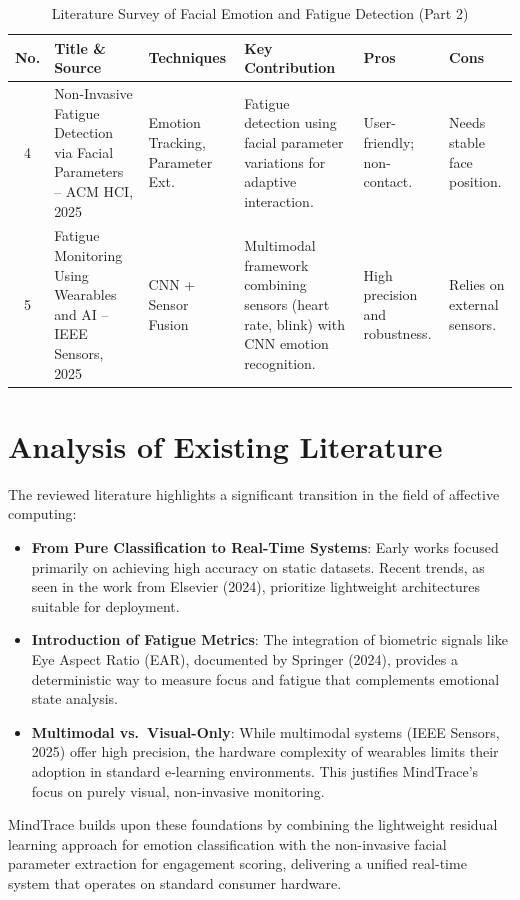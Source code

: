 \begin{table}[H]
\centering
\caption{Literature Survey of Facial Emotion and Fatigue Detection (Part 2)}
\label{tab:lit_survey_2}
\renewcommand{\arraystretch}{1.5}
\begin{tabularx}{\textwidth}{|c|X|p{2.5cm}|X|p{2cm}|p{2cm}|}
\hline
\textbf{No.} & \textbf{Title \& Source} & \textbf{Techniques} & \textbf{Key Contribution} & \textbf{Pros} & \textbf{Cons} \\
\hline
4 & Non-Invasive Fatigue Detection via Facial Parameters -- ACM HCI, 2025 & Emotion Tracking, Parameter Ext. & Fatigue detection using facial parameter variations for adaptive interaction. & User-friendly; non-contact. & Needs stable face position. \\
\hline
5 & Fatigue Monitoring Using Wearables and AI -- IEEE Sensors, 2025 & CNN + Sensor Fusion & Multimodal framework combining sensors (heart rate, blink) with CNN emotion recognition. & High precision and robustness. & Relies on external sensors. \\
\hline
\end{tabularx}
\end{table}

\section{Analysis of Existing Literature}

The reviewed literature highlights a significant transition in the field of
affective computing:

\begin{itemize}
    \item \textbf{From Pure Classification to Real-Time Systems}: Early
          works focused primarily on achieving high accuracy on static
          datasets. Recent trends, as seen in the work from Elsevier (2024),
          prioritize lightweight architectures suitable for deployment.
    
    \item \textbf{Introduction of Fatigue Metrics}: The integration of
          biometric signals like Eye Aspect Ratio (EAR), documented by
          Springer (2024), provides a deterministic way to measure focus
          and fatigue that complements emotional state analysis.
    
    \item \textbf{Multimodal vs.\ Visual-Only}: While multimodal systems
          (IEEE Sensors, 2025) offer high precision, the hardware
          complexity of wearables limits their adoption in standard
          e-learning environments. This justifies MindTrace's focus on
          purely visual, non-invasive monitoring.
\end{itemize}

MindTrace builds upon these foundations by combining the lightweight residual
learning approach for emotion classification with the non-invasive facial
parameter extraction for engagement scoring, delivering a unified real-time
system that operates on standard consumer hardware.
